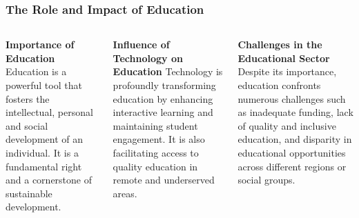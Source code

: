 \documentclass[5pt]{beamer}
\begin{document}
\begin{frame}
\frametitle{The Role and Impact of Education}
\begin{columns}
\begin{column}{0.3\textwidth}
\begin{block}{\textbf{Importance of Education}}
Education is a powerful tool that fosters the intellectual, personal and social development of an individual. It is a fundamental right and a cornerstone of sustainable development.
\end{block}
\end{column}
\begin{column}{0.3\textwidth}
\begin{block}{\textbf{Influence of Technology on Education}}
Technology is profoundly transforming education by enhancing interactive learning and maintaining student engagement. It is also facilitating access to quality education in remote and underserved areas.
\end{block}
\end{column}
\begin{column}{0.3\textwidth}
\begin{block}{\textbf{Challenges in the Educational Sector}}
Despite its importance, education confronts numerous challenges such as inadequate funding, lack of quality and inclusive education, and disparity in educational opportunities across different regions or social groups.
\end{block}
\end{column}
\end{columns}
\end{frame}
\end{document}
